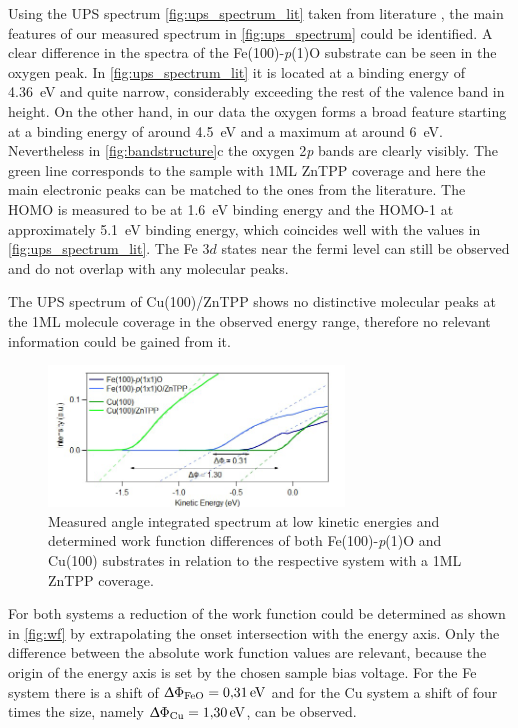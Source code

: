 \FloatBarrier
Using the UPS spectrum \autoref{fig:ups_spectrum_lit} taken from literature \cite*{tesi}, the main features of our measured spectrum in \autoref{fig:ups_spectrum} could be identified.
A clear difference in the spectra of the Fe(100)-\textit{p}(1)O substrate can be seen in the oxygen peak. In \autoref{fig:ups_spectrum_lit} it is located at a binding energy of \qty{4.36}{eV} and quite narrow, considerably exceeding the rest of the valence band in height. 
On the other hand, in our data the oxygen forms a broad feature starting at a binding energy of around \qty{4.5}{eV} and a maximum at around \qty{6}{eV}.
Nevertheless in \autoref{fig:bandstructure}c the oxygen 2\textit{p} bands are clearly visibly.
The green line corresponds to the sample with 1ML ZnTPP coverage and here the main electronic peaks can be matched to the ones from the literature.
The HOMO is measured to be at \qty{1.6}{eV} binding energy and the HOMO-1 at approximately \qty{5.1}{eV} binding energy, which coincides well with the values in \autoref{fig:ups_spectrum_lit}.
The Fe $3d$ states near the fermi level can still be observed and do not overlap with any molecular peaks.

The UPS spectrum of Cu(100)/ZnTPP shows no distinctive molecular peaks at the 1ML molecule coverage in the observed energy range, therefore no relevant information could be gained from it.

\begin{figure}[h]
    \centering
    \includegraphics[width = 0.7\textwidth]{Plots/WF.png}
    \caption{Measured angle integrated spectrum at low kinetic energies and determined work function differences of both Fe(100)-\textit{p}(1)O and Cu(100) substrates in relation to the respective system with a 1ML ZnTPP coverage.}
    \label{fig:wf}
\end{figure}

For both systems a reduction of the work function could be determined as shown in \autoref{fig:wf} by extrapolating the onset intersection with the energy axis. Only the difference between the absolute work function values are relevant, because the origin of the energy axis is set by the chosen sample bias voltage.
For the Fe system there is a shift of $\Updelta\Phi_{\mathrm{FeO}} = \qty{0.31}{eV}$ and for the Cu system a shift of four times the size, namely $\Updelta\Phi_{\mathrm{Cu}} = \qty{1.30}{eV}$, can be observed.

